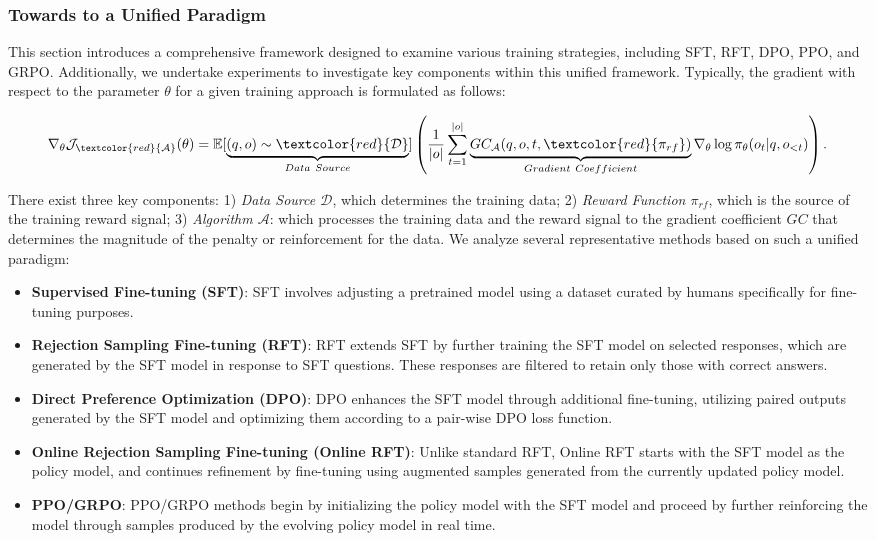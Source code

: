 \begin{itemize}[topsep=0pt]
\begin{itemize}[topsep=0pt]
\subsubsection{Towards to a Unified Paradigm} This section introduces a comprehensive framework designed to examine various training strategies, including SFT, RFT, DPO, PPO, and GRPO. Additionally, we undertake experiments to investigate key components within this unified framework. Typically, the gradient with respect to the parameter $\theta$ for a given training approach is formulated as follows:

\begin{equation}
    \nabla_{\theta}\mathcal{J}_{\textcolor{red}{\mathcal{A}}}(\theta) = \mathbb{E}[\underbrace{(q,o) \sim \textcolor{red}{\mathcal{D}}}_{Data \ Source}]\left( \frac{1}{|o|} \sum_{t=1}^{|o|}  \underbrace{GC_{{\mathcal{A}}}(q, o, t, \textcolor{red}{\pi_{{rf}}})}_{Gradient \ Coefficient}  \nabla_{\theta}\log \pi_{\theta}(o_t | q, o_{<t})\right).
\label{eq:objective}
\end{equation}

There exist three key components: 1) \textit{Data Source $\mathcal{D}$}, which determines the training data; 2) \textit{Reward Function $\pi_{{rf}}$}, which is the source of the training reward signal; 3) \textit{Algorithm $\mathcal{A}$}: which processes the training data and the reward signal to the gradient coefficient $GC$ that determines the magnitude of the penalty or reinforcement for the data. We analyze several representative methods based on such a unified paradigm:

\begin{itemize}
    \item  \textbf{Supervised Fine-tuning (SFT)}: SFT involves adjusting a pretrained model using a dataset curated by humans specifically for fine-tuning purposes.
    \item \textbf{Rejection Sampling Fine-tuning (RFT)}: RFT extends SFT by further training the SFT model on selected responses, which are generated by the SFT model in response to SFT questions. These responses are filtered to retain only those with correct answers.
    \item \textbf{Direct Preference Optimization (DPO)}: DPO enhances the SFT model through additional fine-tuning, utilizing paired outputs generated by the SFT model and optimizing them according to a pair-wise DPO loss function.
    \item \textbf{Online Rejection Sampling Fine-tuning (Online RFT)}: Unlike standard RFT, Online RFT starts with the SFT model as the policy model, and continues refinement by fine-tuning using augmented samples generated from the currently updated policy model.
    \item \textbf{PPO/GRPO}: PPO/GRPO methods begin by initializing the policy model with the SFT model and proceed by further reinforcing the model through samples produced by the evolving policy model in real time.
\end{itemize}


\end{itemize}
\end{itemize}
